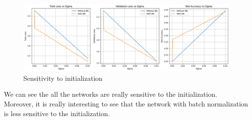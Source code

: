 \documentclass{article}
\begin{document}
\begin{figure}
    \centering
    \includegraphics[width=\linewidth]{Result_Pics/sensitivity to initialization.png}
    \caption{Sensitivity to initialization}
\end{figure}

We can see the all the networks are really sensitive to the initialization. Moreover, it is really interesting to see that the network with batch normalization is less sensitive to the initialization. \\
\end{document}
